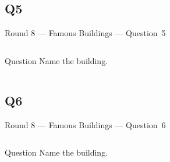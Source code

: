 \documentclass[11pt,draft]{beamer}
\begin{document}
\subsection*{Q5}
\begin{frame}[t]{Round 8 --- Famous Buildings --- \mbox{Question 5}}
    \begin{columns}[T,totalwidth=\linewidth]
        \begin{column}{0.32\linewidth}
            \begin{block}{Question}
                Name the building.
            \end{block}
        \end{column}
        \begin{column}{0.65\linewidth}
            \begin{center}
                \texttt{[image: \{Images/monticello]}.jpg}
            \end{center}
        \end{column}
    \end{columns}
\end{frame}
\subsection*{Q6}
\begin{frame}[t]{Round 8 --- Famous Buildings --- \mbox{Question 6}}
    \begin{columns}[T,totalwidth=\linewidth]
        \begin{column}{0.32\linewidth}
            \begin{block}{Question}
                Name the building.
            \end{block}
        \end{column}
        \begin{column}{0.65\linewidth}
            \begin{center}
                \texttt{[image: \{Images/sagrada]}.jpg}
            \end{center}
        \end{column}
    \end{columns}
\end{frame}
\end{document}
